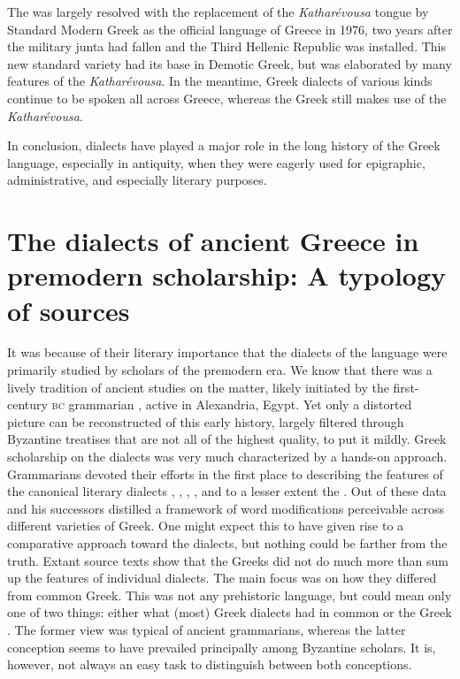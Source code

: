 The  was largely resolved with the replacement of the \textit{Katharévousa} tongue by Standard Modern Greek as the official language of Greece in 1976, two years after the military junta had fallen and the Third Hellenic Republic was installed. This new standard variety had its base in Demotic Greek, but was elaborated by many features of the \textit{Katharévousa}. In the meantime,  Greek dialects of various kinds continue to be spoken all across Greece, whereas the Greek  still makes use of the \textit{Katharévousa}.

In conclusion, dialects have played a major role in the long history of the Greek language, especially in antiquity, when they were eagerly used for epigraphic, administrative, and especially literary purposes.

\section[The dialects of ancient Greece in premodern scholarship]{The dialects of ancient Greece in premodern scholarship: A typology of sources}\label{sec:1.2}

It was because of their literary importance that the dialects of the  language were primarily studied by scholars of the premodern era. We know that there was a lively tradition of ancient studies on the matter, likely initiated by the first-century \textsc{bc} grammarian , active in Alexandria, Egypt. Yet only a distorted picture can be reconstructed of this early history, largely filtered through Byzantine treatises that are not all of the highest quality, to put it mildly. Greek scholarship on the dialects was very much characterized by a hands-on approach. Grammarians devoted their efforts in the first place to describing the features of the canonical literary dialects , , , , and to a lesser extent the . Out of these data  and his successors distilled a framework of word modifications perceivable across different varieties of Greek. One might expect this to have given rise to a comparative approach toward the dialects, but nothing could be farther from the truth. Extant source texts show that the Greeks did not do much more than sum up the features of individual dialects. The main focus was on how they differed from common Greek. This was not any prehistoric  language, but could mean only one of two things: either what (most) Greek dialects had in common or the Greek . The former view was typical of ancient grammarians, whereas the latter conception seems to have prevailed principally among Byzantine scholars. It is, however, not always an easy task to distinguish between both conceptions.

